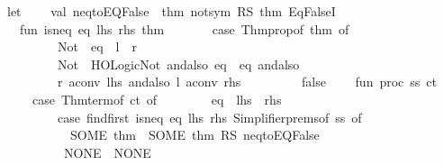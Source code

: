 \begin{isabellebody}
\ \ let\isanewline
\ \ \ \ val\ neq{\isacharunderscore}{\kern0pt}to{\isacharunderscore}{\kern0pt}EQ{\isacharunderscore}{\kern0pt}False\ {\isacharequal}{\kern0pt}\ {\isacharat}{\kern0pt}{\isacharbraceleft}{\kern0pt}thm\ not{\isacharunderscore}{\kern0pt}sym{\isacharbraceright}{\kern0pt}\ RS\ {\isacharat}{\kern0pt}{\isacharbraceleft}{\kern0pt}thm\ Eq{\isacharunderscore}{\kern0pt}FalseI{\isacharbraceright}{\kern0pt}{\isacharsemicolon}{\kern0pt}\isanewline
\ \ \ \ fun\ is{\isacharunderscore}{\kern0pt}neq\ eq\ lhs\ rhs\ thm\ {\isacharequal}{\kern0pt}\isanewline
\ \ \ \ \ \ {\isacharparenleft}{\kern0pt}case\ Thm{\isachardot}{\kern0pt}prop{\isacharunderscore}{\kern0pt}of\ thm\ of\isanewline
\ \ \ \ \ \ \ \ {\isacharunderscore}{\kern0pt}\ {\isachardollar}{\kern0pt}\ {\isacharparenleft}{\kern0pt}Not\ {\isachardollar}{\kern0pt}\ {\isacharparenleft}{\kern0pt}eq{\isacharprime}{\kern0pt}\ {\isachardollar}{\kern0pt}\ l{\isacharprime}{\kern0pt}\ {\isachardollar}{\kern0pt}\ r{\isacharprime}{\kern0pt}{\isacharparenright}{\kern0pt}{\isacharparenright}{\kern0pt}\ {\isacharequal}{\kern0pt}{\isachargreater}{\kern0pt}\isanewline
\ \ \ \ \ \ \ \ \ \ Not\ {\isacharequal}{\kern0pt}\ HOLogic{\isachardot}{\kern0pt}Not\ andalso\ eq{\isacharprime}{\kern0pt}\ {\isacharequal}{\kern0pt}\ eq\ andalso\isanewline
\ \ \ \ \ \ \ \ \ \ r{\isacharprime}{\kern0pt}\ aconv\ lhs\ andalso\ l{\isacharprime}{\kern0pt}\ aconv\ rhs\isanewline
\ \ \ \ \ \ {\isacharbar}{\kern0pt}\ {\isacharunderscore}{\kern0pt}\ {\isacharequal}{\kern0pt}{\isachargreater}{\kern0pt}\ false{\isacharparenright}{\kern0pt}{\isacharsemicolon}{\kern0pt}\isanewline
\ \ \ \ fun\ proc\ ss\ ct\ {\isacharequal}{\kern0pt}\isanewline
\ \ \ \ \ \ {\isacharparenleft}{\kern0pt}case\ Thm{\isachardot}{\kern0pt}term{\isacharunderscore}{\kern0pt}of\ ct\ of\isanewline
\ \ \ \ \ \ \ \ eq\ {\isachardollar}{\kern0pt}\ lhs\ {\isachardollar}{\kern0pt}\ rhs\ {\isacharequal}{\kern0pt}{\isachargreater}{\kern0pt}\isanewline
\ \ \ \ \ \ \ \ \ \ {\isacharparenleft}{\kern0pt}case\ find{\isacharunderscore}{\kern0pt}first\ {\isacharparenleft}{\kern0pt}is{\isacharunderscore}{\kern0pt}neq\ eq\ lhs\ rhs{\isacharparenright}{\kern0pt}\ {\isacharparenleft}{\kern0pt}Simplifier{\isachardot}{\kern0pt}prems{\isacharunderscore}{\kern0pt}of\ ss{\isacharparenright}{\kern0pt}\ of\isanewline
\ \ \ \ \ \ \ \ \ \ \ \ SOME\ thm\ {\isacharequal}{\kern0pt}{\isachargreater}{\kern0pt}\ SOME\ {\isacharparenleft}{\kern0pt}thm\ RS\ neq{\isacharunderscore}{\kern0pt}to{\isacharunderscore}{\kern0pt}EQ{\isacharunderscore}{\kern0pt}False{\isacharparenright}{\kern0pt}\isanewline
\ \ \ \ \ \ \ \ \ \ {\isacharbar}{\kern0pt}\ NONE\ {\isacharequal}{\kern0pt}{\isachargreater}{\kern0pt}\ NONE{\isacharparenright}{\kern0pt}\isanewline

\end{isabellebody}
